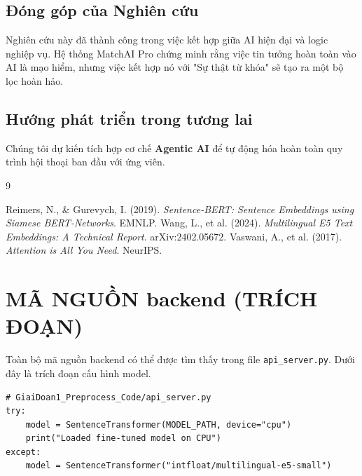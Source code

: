 \documentclass[12pt,a4paper,oneside]{report}
\begin{document}
\section{Đóng góp của Nghiên cứu}
Nghiên cứu này đã thành công trong việc kết hợp giữa AI hiện đại và logic nghiệp vụ. Hệ thống MatchAI Pro chứng minh rằng việc tin tưởng hoàn toàn vào AI là mạo hiểm, nhưng việc kết hợp nó với "Sự thật từ khóa" sẽ tạo ra một bộ lọc hoàn hảo.

\section{Hướng phát triển trong tương lai}
Chúng tôi dự kiến tích hợp cơ chế \textbf{Agentic AI} để tự động hóa hoàn toàn quy trình hội thoại ban đầu với ứng viên.


\begin{thebibliography}{9}
 Reimers, N., \& Gurevych, I. (2019). \textit{Sentence-BERT: Sentence Embeddings using Siamese BERT-Networks}. EMNLP.
 Wang, L., et al. (2024). \textit{Multilingual E5 Text Embeddings: A Technical Report}. arXiv:2402.05672.
 Vaswani, A., et al. (2017). \textit{Attention is All You Need}. NeurIPS.
\end{thebibliography}

\appendix
\chapter{MÃ NGUỒN backend (TRÍCH ĐOẠN)}
Toàn bộ mã nguồn backend có thể được tìm thấy trong file \texttt{api\_server.py}. Dưới đây là trích đoạn cấu hình model.

\begin{lstlisting}
# GiaiDoan1_Preprocess_Code/api_server.py
try:
    model = SentenceTransformer(MODEL_PATH, device="cpu")
    print("Loaded fine-tuned model on CPU")
except:
    model = SentenceTransformer("intfloat/multilingual-e5-small")
\end{lstlisting}
\end{document}
